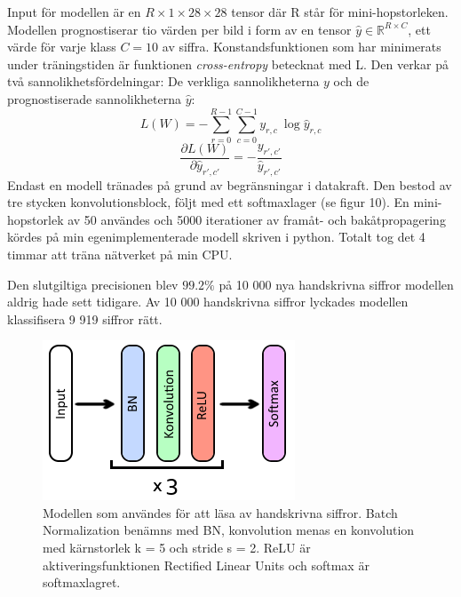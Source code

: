 \documentclass[a4paper,11pt,twoside]{article}
\newcommand*{\pd}[2]{\ensuremath{\dfrac{\partial #1}{\partial #2}}}
\begin{document}
Input för modellen är en $R \times 1 \times 28 \times 28$ tensor där R står för mini-hopstorleken. Modellen prognostiserar tio värden per bild i form av en tensor $\hat{y} \in \mathbb{R}^{R \times C}$, ett värde för varje klass $C=10$ av siffra. Konstandsfunktionen som har minimerats under träningstiden är funktionen \textit{cross-entropy} betecknat med L. Den verkar på två sannolikhetsfördelningar: De verkliga sannolikheterna $y$ och de prognostiserade sannolikheterna $\hat{y}$: \cite{cs231n} \cite{notesonbackprop}
\begin{equation}
L(W) = - \sum^{R-1}_{r=0} \sum^{C-1}_{c=0}y_{r,c} \ \log{\hat{y}_{r,c}}
\end{equation}
\begin{equation}
\pd{L(W)}{\hat{y}_{r',c'}} = - \frac{y_{r',c'}}{\hat{y}_{r',c'}}
\end{equation}
Endast en modell tränades på grund av begränsningar i datakraft. Den bestod av tre stycken konvolutionsblock, följt med ett softmaxlager (se figur 10). En mini-hopstorlek av 50 användes och 5000 iterationer av framåt- och bakåtpropagering kördes på min egenimplementerade modell skriven i python. Totalt tog det 4 timmar att träna nätverket på min CPU. 

Den slutgiltiga precisionen blev $99.2\%$ på 10 000 nya handskrivna siffror modellen aldrig hade sett tidigare. Av 10 000 handskrivna siffror lyckades modellen klassifisera 9 919 siffror rätt.

\begin{figure}[h]\label{MNISTmodel}
	\centering
  		\includegraphics[scale=1.2]{MNISTmodel.png}
  	\caption{Modellen som användes för att läsa av handskrivna siffror. Batch Normalization benämns med BN, konvolution menas en konvolution med kärnstorlek k = 5 och stride s = 2. ReLU är aktiveringsfunktionen Rectified Linear Units och softmax är softmaxlagret.}
\end{figure}
\end{document}
